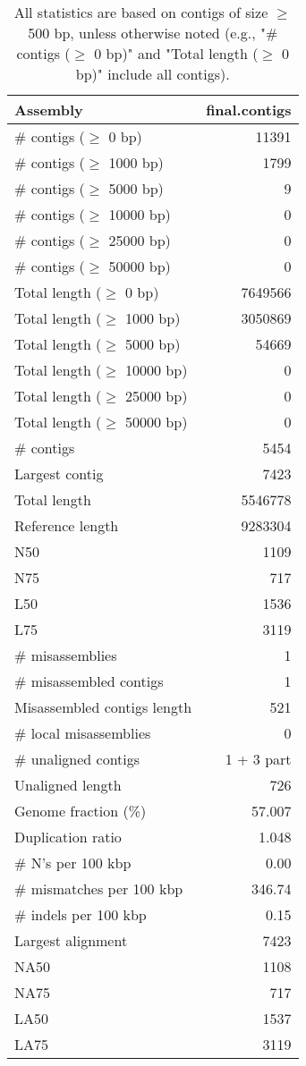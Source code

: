 \documentclass[12pt,a4paper]{article}
\begin{document}
\begin{table}[ht]
\begin{center}
\caption{All statistics are based on contigs of size $\geq$ 500 bp, unless otherwise noted (e.g., "\# contigs ($\geq$ 0 bp)" and "Total length ($\geq$ 0 bp)" include all contigs).}
\begin{tabular}{|l*{1}{|r}|}
\hline
Assembly & final.contigs \\ \hline
\# contigs ($\geq$ 0 bp) & 11391 \\ \hline
\# contigs ($\geq$ 1000 bp) & 1799 \\ \hline
\# contigs ($\geq$ 5000 bp) & 9 \\ \hline
\# contigs ($\geq$ 10000 bp) & 0 \\ \hline
\# contigs ($\geq$ 25000 bp) & 0 \\ \hline
\# contigs ($\geq$ 50000 bp) & 0 \\ \hline
Total length ($\geq$ 0 bp) & 7649566 \\ \hline
Total length ($\geq$ 1000 bp) & 3050869 \\ \hline
Total length ($\geq$ 5000 bp) & 54669 \\ \hline
Total length ($\geq$ 10000 bp) & 0 \\ \hline
Total length ($\geq$ 25000 bp) & 0 \\ \hline
Total length ($\geq$ 50000 bp) & 0 \\ \hline
\# contigs & 5454 \\ \hline
Largest contig & 7423 \\ \hline
Total length & 5546778 \\ \hline
Reference length & 9283304 \\ \hline
N50 & 1109 \\ \hline
N75 & 717 \\ \hline
L50 & 1536 \\ \hline
L75 & 3119 \\ \hline
\# misassemblies & 1 \\ \hline
\# misassembled contigs & 1 \\ \hline
Misassembled contigs length & 521 \\ \hline
\# local misassemblies & 0 \\ \hline
\# unaligned contigs & 1 + 3 part \\ \hline
Unaligned length & 726 \\ \hline
Genome fraction (\%) & 57.007 \\ \hline
Duplication ratio & 1.048 \\ \hline
\# N's per 100 kbp & 0.00 \\ \hline
\# mismatches per 100 kbp & 346.74 \\ \hline
\# indels per 100 kbp & 0.15 \\ \hline
Largest alignment & 7423 \\ \hline
NA50 & 1108 \\ \hline
NA75 & 717 \\ \hline
LA50 & 1537 \\ \hline
LA75 & 3119 \\ \hline
\end{tabular}
\end{center}
\end{table}
\end{document}
